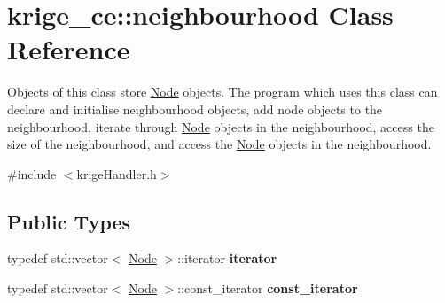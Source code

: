 \hypertarget{classkrige__ce_1_1neighbourhood}{}\section{krige\+\_\+ce\+:\+:neighbourhood Class Reference}
\label{classkrige__ce_1_1neighbourhood}


Objects of this class store \hyperlink{classkrige__ce_1_1Node}{Node} objects. The program which uses this class can declare and initialise neighbourhood objects, add node objects to the neighbourhood, iterate through \hyperlink{classkrige__ce_1_1Node}{Node} objects in the neighbourhood, access the size of the neighbourhood, and access the \hyperlink{classkrige__ce_1_1Node}{Node} objects in the neighbourhood.  




{\ttfamily \#include $<$krige\+Handler.\+h$>$}

\subsection*{Public Types}
\begin{DoxyCompactItemize}
\item 
\mbox{\label{classkrige__ce_1_1neighbourhood_a36edf2c32cd3fffa3c157b5a42c4ba59}} 
typedef std\+::vector$<$ \hyperlink{classkrige__ce_1_1Node}{Node} $>$\+::iterator {\bfseries iterator}
\item 
\mbox{\label{classkrige__ce_1_1neighbourhood_abff620da22ea32f8c561cc912580361a}} 
typedef std\+::vector$<$ \hyperlink{classkrige__ce_1_1Node}{Node} $>$\+::const\+\_\+iterator {\bfseries const\+\_\+iterator}
\end{DoxyCompactItemize}
